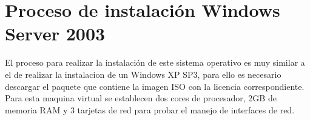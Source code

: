 \documentclass[paper=a4, fontsize=12pt]{article} 		%
\numberwithin{equation}{section}						%
\numberwithin{table}{section} 							%
\begin{document}
\section{Proceso de instalación Windows Server 2003}
El proceso para realizar la instalación de este sistema operativo es muy similar a el de realizar la instalacion de un Windows XP SP3, para ello es necesario descargar el paquete que contiene la imagen ISO con la licencia correspondiente. Para esta maquina virtual se establecen dos cores de procesador, 2GB de memoria RAM y 3 tarjetas de red para probar el  manejo de interfaces de red.
\begin{figure}[H]
 	\centering
       \hfill
\end{figure}
\end{document}
